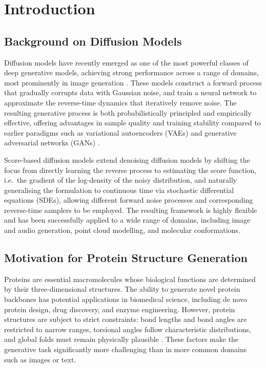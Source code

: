 \documentclass[a4paper,12pt]{article}
\begin{document}
\section{Introduction}
\subsection{Background on Diffusion Models}
Diffusion models have recently emerged as one of the most powerful classes of deep generative models, achieving strong performance across a range of domains, most prominently in image generation \citep{hoDenoisingDiffusionProbabilistic2020,dhariwal2021DiffusionModelsBeat}. These models construct a forward process that gradually corrupts data with Gaussian noise, and train a neural network to approximate the reverse-time dynamics that iteratively remove noise. The resulting generative process is both probabilistically principled and empirically effective, offering advantages in sample quality and training stability compared to earlier paradigms such as variational autoencoders (VAEs) \citep{kingma2022AutoEncodingVariationalBayes} and generative adversarial networks (GANs) \citep{goodfellow2020GenerativeAdversarialNetworks}.

Score-based diffusion models \citep{song2019GenerativeModelingEstimating,songImprovedTechniquesTraining2020,song2021ScoreBasedGenerativeModeling,songMaximumLikelihoodTraining2021} extend denoising diffusion models by shifting the focus from directly learning the reverse process to estimating the score function, i.e.\ the gradient of the log-density of the noisy distribution, and naturally generalising the formulation to continuous time via stochastic differential equations (SDEs), allowing different forward noise processes and corresponding reverse-time samplers to be employed. The resulting framework is highly flexible and has been successfully applied to a wide range of domains, including image and audio generation, point cloud modelling, and molecular conformations.

\subsection{Motivation for Protein Structure Generation}
Proteins are essential macromolecules whose biological functions are determined by their three-dimensional structures. The ability to generate novel protein backbones has potential applications in biomedical science, including de novo protein design, drug discovery, and enzyme engineering. However, protein structures are subject to strict constraints: bond lengths and bond angles are restricted to narrow ranges, torsional angles follow characteristic distributions, and global folds must remain physically plausible \citep{creighton1993proteins,branden2012IntroductionProteinStructure}. These factors make the generative task significantly more challenging than in more common domains such as images or text.
\end{document}
